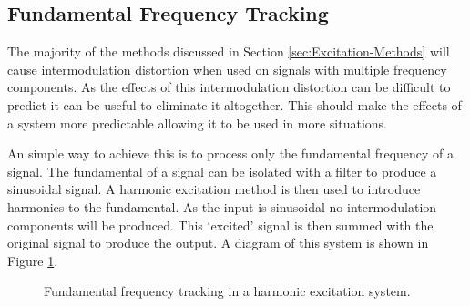 	\subsection{Fundamental Frequency Tracking}
	\label{sec:FeatureControl-Fundamental}
		The majority of the methods discussed in Section \ref{sec:Excitation-Methods} will cause intermodulation
		distortion when used on signals with multiple frequency components. As the effects of this intermodulation
		distortion can be difficult to predict it can be useful to eliminate it altogether. This should make the
		effects of a system more predictable allowing it to be used in more situations.

		An simple way to achieve this is to process only the fundamental frequency of a signal. The fundamental of
		a signal can be isolated with a filter to produce a sinusoidal signal. A harmonic excitation method is then
		used to introduce harmonics to the fundamental. As the input is sinusoidal no intermodulation components
		will be produced. This `excited' signal is then summed with the original signal to produce the output. A
		diagram of this system is shown in Figure \ref{fig:F0Tracking}.

		\begin{figure}[h!]
			\centering
			\caption{Fundamental frequency tracking in a harmonic excitation system.}
			\label{fig:F0Tracking}
		\end{figure}


